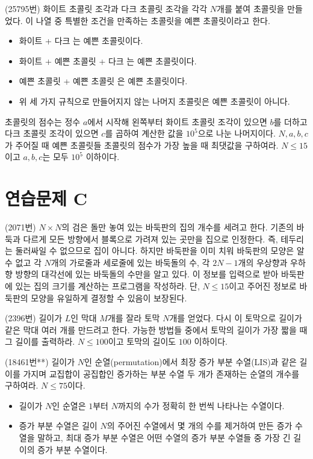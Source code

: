 \begin{problem}
    (25795번) 화이트 초콜릿 조각과 다크 초콜릿 조각을 각각 $N$개를 붙여 초콜릿을 만들었다. 이 나열 중 특별한 조건을 만족하는 초콜릿을 예쁜 초콜릿이라고 한다.
    \begin{itemize}
        \item 화이트 + 다크 는 예쁜 초콜릿이다.
        \item 화이트 + 예쁜 초콜릿 + 다크 는 예쁜 초콜릿이다.
        \item 예쁜 초콜릿 + 예쁜 초콜릿 은 예쁜 초콜릿이다.
        \item 위 세 가지 규칙으로 만들어지지 않는 나머지 초콜릿은 예쁜 초콜릿이 아니다.
    \end{itemize}
    초콜릿의 점수는 정수 $a$에서 시작해 왼쪽부터 화이트 초콜릿 조각이 있으면 $b$를 더하고 다크 초콜릿 조각이 있으면 $c$를 곱하여 계산한 값을 $10^5$으로 나눈 나머지이다. $N, a, b, c$가 주어질 때 예쁜 초콜릿들 초콜릿의 점수가 가장 높을 때 최댓값을 구하여라. $N \leq 15$이고 $a, b, c$는 모두 $10^5$ 이하이다.
\end{problem}

\section{연습문제 C}

\begin{problem} 
    (2071번) $N \times N$의 검은 돌만 놓여 있는 바둑판의 집의 개수를 세려고 한다. 기존의 바둑과 다르게 모든 방향에서 블록으로 가려져 있는 곳만을 집으로 인정한다. 즉, 테두리는 둘러싸일 수 없으므로 집이 아니다. 하지만 바둑판을 이미 치워 바둑판의 모양은 알 수 없고 각 $N$개의 가로줄과 세로줄에 있는 바둑돌의 수, 각 $2N-1$개의 우상향과 우하향 방향의 대각선에 있는 바둑돌의 수만을 알고 있다. 이 정보를 입력으로 받아 바둑판에 있는 집의 크기를 계산하는 프로그램을 작성하라. 단, $N \leq 15$이고 주어진 정보로 바둑판의 모양을 유일하게 결정할 수 있음이 보장된다.
\end{problem}

\begin{problem}
    (2396번) 길이가 $L$인 막대 $M$개를 잘라 토막 $N$개를 얻었다. 다시 이 토막으로 길이가 같은 막대 여러 개를 만드려고 한다. 가능한 방법들 중에서 토막의 길이가 가장 짧을 때 그 길이를 출력하라. $N \leq 100$이고 토막의 길이도 $100$ 이하이다.
\end{problem}

\begin{problem}
    (18461번**) 길이가 $N$인 순열(permutation)에서 최장 증가 부분 수열(LIS)과 같은 길이를 가지며 교집합이 공집합인 증가하는 부분 수열 두 개가 존재하는 순열의 개수를 구하여라. $N \leq 75$이다.
    \begin{itemize}
        \item 길이가 $N$인 순열은 $1$부터 $N$까지의 수가 정확히 한 번씩 나타나는 수열이다.
        \item 증가 부분 수열은 길이 $N$의 주어진 수열에서 몇 개의 수를 제거하여 만든 증가 수열을 말하고, 최대 증가 부분 수열은 어떤 수열의 증가 부분 수열들 중 가장 긴 길이의 증가 부분 수열이다.
    \end{itemize}
\end{problem}

